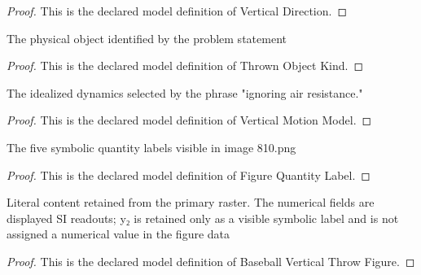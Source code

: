 \begin{proof}
  This is the declared model definition of Vertical Direction.
\end{proof}
\begin{definition}
  \label{def:physics:phyx-mini-0810:phyxminiproblems-problemphyxmini0810-thrownobjectkind}
  The physical object identified by the problem statement
\end{definition}
\begin{proof}
  This is the declared model definition of Thrown Object Kind.
\end{proof}
\begin{definition}
  \label{def:physics:phyx-mini-0810:phyxminiproblems-problemphyxmini0810-verticalmotionmodel}
  The idealized dynamics selected by the phrase "ignoring air resistance."
\end{definition}
\begin{proof}
  This is the declared model definition of Vertical Motion Model.
\end{proof}
\begin{definition}
  \label{def:physics:phyx-mini-0810:phyxminiproblems-problemphyxmini0810-figurequantitylabel}
  The five symbolic quantity labels visible in image 810.png
\end{definition}
\begin{proof}
  This is the declared model definition of Figure Quantity Label.
\end{proof}
\begin{definition}
  \label{def:physics:phyx-mini-0810:phyxminiproblems-problemphyxmini0810-baseballverticalthrowfigure}
  Literal content retained from the primary raster. The numerical fields are displayed SI readouts; y₂ is retained only as a visible symbolic label and is not assigned a numerical value in the figure data
\end{definition}
\begin{proof}
  This is the declared model definition of Baseball Vertical Throw Figure.
\end{proof}
